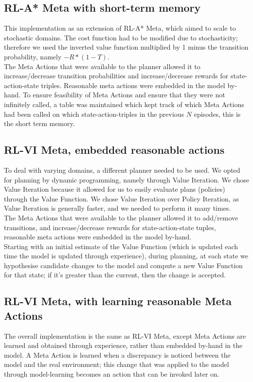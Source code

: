 \subsection{RL-A* Meta with short-term memory}
This implementation as an extension of RL-A* Meta, which aimed to scale to stochastic domains. The cost function had to be modified due to stochasticity; therefore we used the inverted value function multiplied by 1 minus the transition probability, namely $-R  * (1-T)$.
\\ The Meta Actions that were available to the planner allowed it to increase/decrease transition probabilities and increase/decrease rewards for state-action-state triples. Reasonable meta actions were embedded in the model by-hand. To ensure feasibility of Meta Actions and ensure that they were not infinitely called, a table was maintained which kept track of which Meta Actions had been called on which state-action-triples in the previous $N$ episodes, this is the short term memory.
\subsection{RL-VI Meta, embedded reasonable actions}
To deal with varying domains, a different planner needed to be used. We opted for planning by dynamic programming, namely through Value Iteration. We chose Value Iteration because it allowed for us to easily evaluate plans (policies) through the Value Function. We chose Value Iteration over Policy Iteration, as Value Iteration is generally faster, and we needed to perform it many times.
\\The Meta Actions that were available to the planner allowed it to add/remove transitions, and increase/decrease rewards for state-action-state tuples, reasonable meta actions were embedded in the model by-hand.
\\Starting with an initial estimate of the Value Function (which is updated each time the model is updated through experience), during planning, at each state we hypothesise candidate changes to the model and compute a new Value Function for that state; if it's greater than the current, then the change is accepted.
\subsection{RL-VI Meta, with learning reasonable Meta Actions}
The overall implementation is the same as RL-VI Meta, except Meta Actions are learned and obtained through experience, rather than embedded by-hand in the model. A Meta Action is learned when a discrepancy is noticed between the model and the real environment; this change that was applied to the model through model-learning becomes an action that can be invoked later on.
